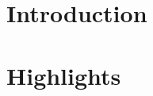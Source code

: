 \documentclass[conference]{IEEEtran}
\begin{document}
\begin{abstract}
%
%
\end{abstract}


\section{Introduction}
\label{sec:intro}


\section{Highlights}
\label{sec:highlights}

\end{document}
